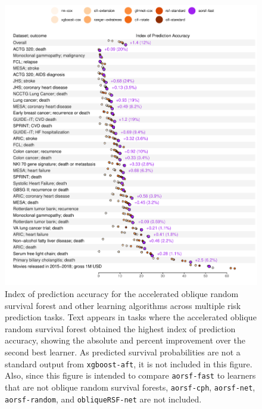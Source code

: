\documentclass{article}\usepackage[]{graphicx}\usepackage[]{xcolor}
\makeatletter
\def\maxwidth{ %
  \ifdim\Gin@nat@width>\linewidth
    \linewidth
  \else
    \Gin@nat@width
  \fi
}
\newenvironment{knitrout}{}{} %
\makeatother
\begin{document}
\begin{knitrout}
\color{fgcolor}\begin{figure}
\includegraphics[width=\maxwidth]{figure/bm_pred_viz_ibs-1} \caption{Index of prediction accuracy for the accelerated oblique random survival forest and other learning algorithms across multiple risk prediction tasks. Text appears in tasks where the accelerated oblique random survival forest obtained the highest index of prediction accuracy, showing the absolute and percent improvement over the second best learner. As predicted survival probabilities are not a standard output from \texttt{xgboost-aft}, it is not included in this figure. Also, since this figure is intended to compare \texttt{aorsf-fast} to learners that are not oblique random survival forests, \texttt{aorsf-cph}, \texttt{aorsf-net}, \texttt{aorsf-random}, and \texttt{obliqueRSF-net} are not included.}\label{fig:bm_pred_viz_ibs}
\end{figure}

\end{knitrout}
\end{document}

